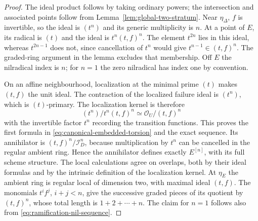 \begin{proof}
The ideal product follows by taking ordinary powers; the intersection
and associated points follow from Lemma~\ref{lem:global-two-stratum}.
Near $\eta_\Delta$, $f$ is invertible, so the ideal is $(t^n)$
and its generic multiplicity is $n$. At a point of $E$, its radical
is $(t)$ and the ideal is $t^n(t,f)^n$. The element $t^{2n}$ lies
in this ideal, whereas $t^{2n-1}$ does not, since cancellation of
$t^n$ would give $t^{n-1}\in(t,f)^n$. The graded-ring argument in
the lemma excludes that membership. Off $E$ the nilradical index
is $n$; for $n=1$ the zero nilradical has index one by convention.

On an affine neighbourhood, localization at the minimal prime
$(t)$ makes $(t,f)$ the unit ideal. The contraction of the localized
failure ideal is $(t^n)$, which is $(t)$-primary. The localization
kernel is therefore
\[
 (t^n)/t^n(t,f)^n\simeq \mathcal O_U/(t,f)^n
\]
with the invertible factor $t^n$ recording the transition functions.
This proves the first formula in
\eqref{eq:canonical-embedded-torsion} and the exact sequence. Its
annihilator is $(t,f)^n/\mathcal I_D^n$, because multiplication
by $t^n$ can be cancelled in the regular ambient ring. Hence the
annihilator defines exactly $E^{[n]}$, with its full scheme structure.
The local calculations agree on overlaps, both by their ideal
formulas and by the intrinsic definition of the localization kernel.
At $\eta_E$ the ambient ring is regular local of dimension two,
with maximal ideal $(t,f)$. The monomials $t^if^j$, $i+j<n$,
give the successive graded pieces of its quotient by $(t,f)^n$,
whose total length is $1+2+\cdots+n$. The claim for $n=1$ follows
also from \eqref{eq:ramification-nil-sequence}.
\end{proof}

